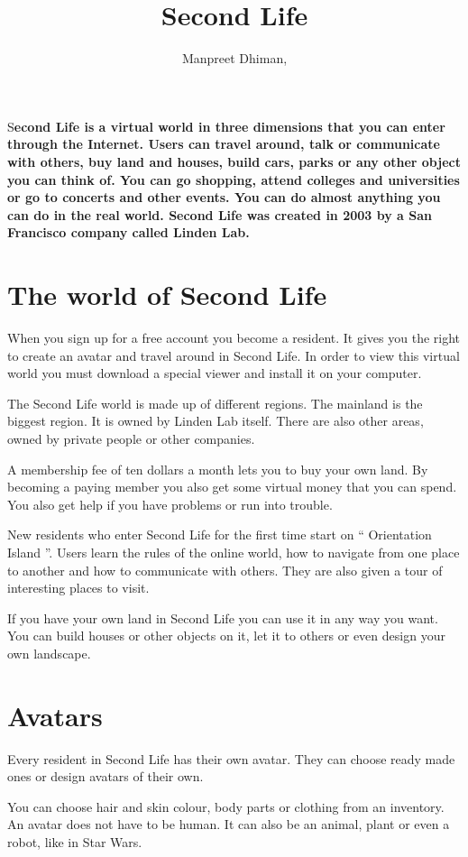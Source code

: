\documentclass[a4paper,twocolumn]{article}
\title{Second Life} %
\author{Manpreet Dhiman, } %
\newcommand{\initial}[1]{ %
\lettrine[lines=3,lhang=0.6,nindent=0em]{
\color{DarkGoldenrod}
{\textsf{#1}}}{}}
\begin{document}
\maketitle
\initial{S}\textbf{econd Life is a virtual world in three dimensions 
that you can enter through the Internet. Users can travel around, talk
or communicate with others, buy land and houses, build cars, parks or
any other object you can think of. You can go shopping, attend colleges
and universities or go to concerts and other events. You can do almost
anything you can do in the real world. Second Life was created in 2003
by a San Francisco company called Linden Lab.} 

\section{The world of Second Life}

When you sign up for a free account you become a resident. It gives you
the right to create an avatar and travel around in Second Life. In
order to view this virtual world you must download a special viewer and
install it on your computer.

The Second Life world is made up of different regions. The mainland is
the biggest region. It is owned by Linden Lab itself. There are also
other areas, owned by private people or other companies.

A membership fee of ten dollars a month lets you to buy your own land.
By becoming a paying member you also get some virtual money that you can
spend. You also get help if you have problems or run into trouble.

 

New residents who enter Second Life for the first time start on “
Orientation Island ”. Users learn the rules of the online world, how to
navigate from one place to another and how to communicate with others.
They are also given a tour of interesting places to visit.

If you have your own land in Second Life you can use it in any way you
want. You can build houses or other objects on it, let it to others or
even design your own landscape. 

\section{Avatars}
Every resident in Second Life has their own avatar. They can
choose ready made ones or design avatars of their own.

You can choose hair and skin colour, body parts or clothing from an
inventory. An avatar does not have to be human. It can also be an
animal, plant or even a robot, like in Star Wars.
\end{document}
